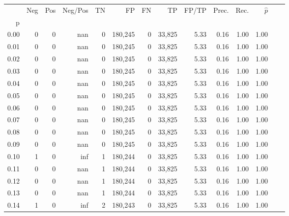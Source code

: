 \begin{tabular}{rrrrrrrrrrrrrr}
\toprule
{} &     Neg &    Pos & Neg/Pos &       TN &       FP &      FN &      TP & FP/TP & Prec. &  Rec. & $\hat{p}$ \\
p    &         &        &         &          &          &         &         &       &       &       &           \\
\midrule
0.00 &       0 &      0 &     nan &        0 &  180,245 &       0 &  33,825 &  5.33 &  0.16 &  1.00 &      1.00 \\
0.01 &       0 &      0 &     nan &        0 &  180,245 &       0 &  33,825 &  5.33 &  0.16 &  1.00 &      1.00 \\
0.02 &       0 &      0 &     nan &        0 &  180,245 &       0 &  33,825 &  5.33 &  0.16 &  1.00 &      1.00 \\
0.03 &       0 &      0 &     nan &        0 &  180,245 &       0 &  33,825 &  5.33 &  0.16 &  1.00 &      1.00 \\
0.04 &       0 &      0 &     nan &        0 &  180,245 &       0 &  33,825 &  5.33 &  0.16 &  1.00 &      1.00 \\
0.05 &       0 &      0 &     nan &        0 &  180,245 &       0 &  33,825 &  5.33 &  0.16 &  1.00 &      1.00 \\
0.06 &       0 &      0 &     nan &        0 &  180,245 &       0 &  33,825 &  5.33 &  0.16 &  1.00 &      1.00 \\
0.07 &       0 &      0 &     nan &        0 &  180,245 &       0 &  33,825 &  5.33 &  0.16 &  1.00 &      1.00 \\
0.08 &       0 &      0 &     nan &        0 &  180,245 &       0 &  33,825 &  5.33 &  0.16 &  1.00 &      1.00 \\
0.09 &       0 &      0 &     nan &        0 &  180,245 &       0 &  33,825 &  5.33 &  0.16 &  1.00 &      1.00 \\
0.10 &       1 &      0 &     inf &        1 &  180,244 &       0 &  33,825 &  5.33 &  0.16 &  1.00 &      1.00 \\
0.11 &       0 &      0 &     nan &        1 &  180,244 &       0 &  33,825 &  5.33 &  0.16 &  1.00 &      1.00 \\
0.12 &       0 &      0 &     nan &        1 &  180,244 &       0 &  33,825 &  5.33 &  0.16 &  1.00 &      1.00 \\
0.13 &       0 &      0 &     nan &        1 &  180,244 &       0 &  33,825 &  5.33 &  0.16 &  1.00 &      1.00 \\
0.14 &       1 &      0 &     inf &        2 &  180,243 &       0 &  33,825 &  5.33 &  0.16 &  1.00 &      1.00 \\

\end{tabular}
